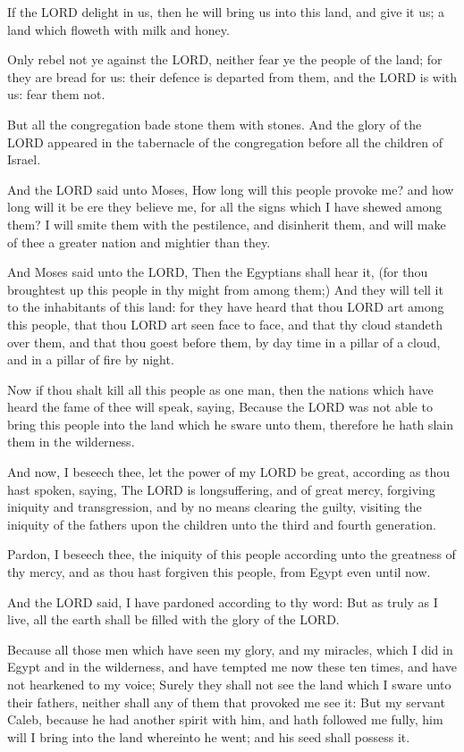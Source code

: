 \Verse If the LORD delight in us, then he will bring us into this land,
and give it us; a land which floweth with milk and honey.

\Verse Only rebel not ye against the LORD, neither fear ye the people of
the land; for they are bread for us: their defence is departed from
them, and the LORD is with us: fear them not.

\Verse But all the congregation bade stone them with stones. And the
glory of the LORD appeared in the tabernacle of the congregation
before all the children of Israel.

\Verse And the LORD said unto Moses, How long will this people provoke
me?  and how long will it be ere they believe me, for all the signs
which I have shewed among them?  \Verse I will smite them with the
pestilence, and disinherit them, and will make of thee a greater
nation and mightier than they.

\Verse And Moses said unto the LORD, Then the Egyptians shall hear it,
(for thou broughtest up this people in thy might from among them;)
\Verse And they will tell it to the inhabitants of this land: for they
have heard that thou LORD art among this people, that thou LORD art
seen face to face, and that thy cloud standeth over them, and that
thou goest before them, by day time in a pillar of a cloud, and in a
pillar of fire by night.

\Verse Now if thou shalt kill all this people as one man, then the
nations which have heard the fame of thee will speak, saying, \Verse
Because the LORD was not able to bring this people into the land which
he sware unto them, therefore he hath slain them in the wilderness.

\Verse And now, I beseech thee, let the power of my LORD be great,
according as thou hast spoken, saying, \Verse The LORD is
longsuffering, and of great mercy, forgiving iniquity and
transgression, and by no means clearing the guilty, visiting the
iniquity of the fathers upon the children unto the third and fourth
generation.

\Verse Pardon, I beseech thee, the iniquity of this people according
unto the greatness of thy mercy, and as thou hast forgiven this
people, from Egypt even until now.

\Verse And the LORD said, I have pardoned according to thy word: \Verse
But as truly as I live, all the earth shall be filled with the glory
of the LORD.

\Verse Because all those men which have seen my glory, and my miracles,
which I did in Egypt and in the wilderness, and have tempted me now
these ten times, and have not hearkened to my voice; \Verse Surely they
shall not see the land which I sware unto their fathers, neither shall
any of them that provoked me see it: \Verse But my servant Caleb,
because he had another spirit with him, and hath followed me fully,
him will I bring into the land whereinto he went; and his seed shall
possess it.

